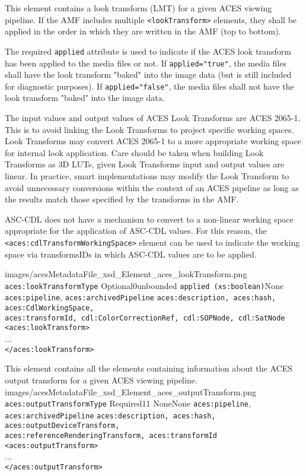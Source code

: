         {This element contains a look transform (LMT) for a given ACES viewing pipeline.  If the AMF includes multiple \texttt{<lookTransform>} elements, they shall be applied in the order in which they are written in the AMF (top to bottom).

        The required \texttt{applied} attribute is used to indicate if the ACES look transform has been applied to the media files or not.  If \texttt{applied="true"}, the media files shall have the look transform "baked" into the image data (but is still included for diagnostic purposes). If \texttt{applied="false"}, the media files shall not have the look transform "baked" into the image data. 
        
        The input values and output values of ACES Look Transforms are ACES 2065-1. This is to avoid linking the Look Transforms to project specific working spaces. Look Transforms may convert ACES 2065-1 to a more appropriate working space for internal look application. Care should be taken when building Look Transforms as 3D LUTs, given Look Transforms input and output values are linear. In practice, smart implementations may modify the Look Transform to avoid unnecessary conversions within the context of an ACES pipeline as long as the results match those specified by the transforms in the AMF.  

        ASC-CDL does not have a mechanism to convert to a non-linear working space appropriate for the application of ASC-CDL values. For this reason, the \texttt{<aces:cdlTransformWorkingSpace>} element can be used to indicate the working space via transformsIDs in which ASC-CDL values are to be applied.}
        {images/acesMetadataFile_xsd_Element_aces_lookTransform.png}
        {\texttt{aces:lookTransformType}}
        {Optional}{0}{unbounded}
        {\texttt{applied (xs:boolean)}}{None}
        {\texttt{aces:pipeline}, \texttt{aces:archivedPipeline}}
        {\texttt{aces:description, aces:hash, aces:CdlWorkingSpace,\\ aces:transformId, cdl:ColorCorrectionRef, cdl:SOPNode, cdl:SatNode}}
        {\lstinline{<aces:lookTransform>} \\
        ... \\
        \lstinline{</aces:lookTransform>}} 

        {This element contains all the elements containing information about the ACES output transform for a given ACES viewing pipeline.}
        {images/acesMetadataFile_xsd_Element_aces_outputTransform.png}
        {\texttt{aces:outputTransformType}}
        {Required}{1}{1}
        {None}{None}
        {\texttt{aces:pipeline}, \texttt{aces:archivedPipeline}}
        {\texttt{aces:description, aces:hash, aces:outputDeviceTransform, \\
        aces:referenceRenderingTransform, aces:transformId}}
        {\lstinline{<aces:outputTransform>} \\
        ... \\
        \lstinline{</aces:outputTransform>}} 

